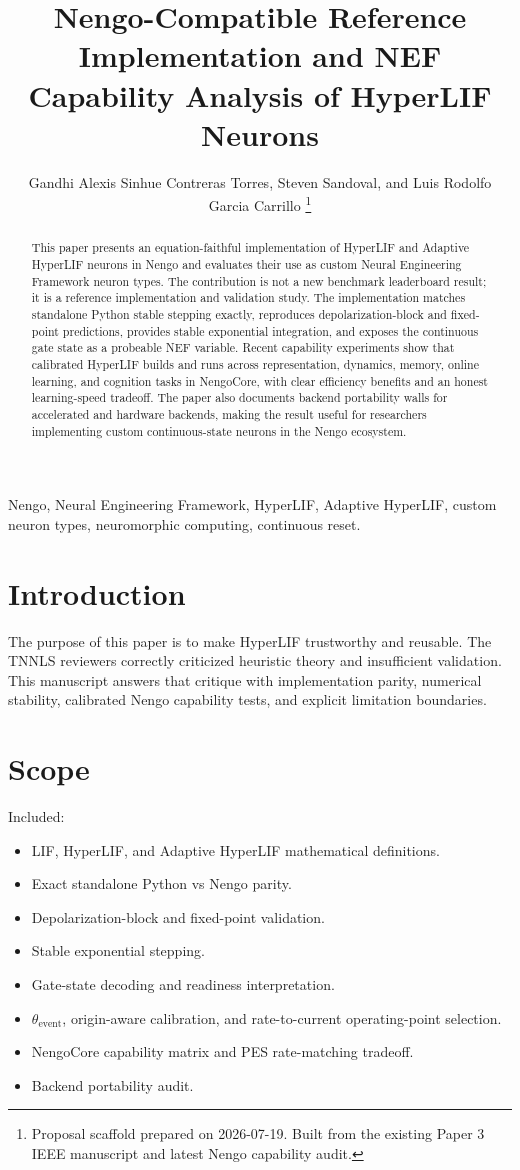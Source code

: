 \documentclass[journal]{IEEEtran}
\title{Nengo-Compatible Reference Implementation and NEF Capability Analysis of HyperLIF Neurons}
\author{Gandhi Alexis Sinhue Contreras Torres, Steven Sandoval, and Luis Rodolfo Garcia Carrillo%
\thanks{Proposal scaffold prepared on 2026-07-19. Built from the existing Paper 3 IEEE manuscript and latest Nengo capability audit.}}
\begin{document}
\maketitle

\begin{abstract}
This paper presents an equation-faithful implementation of HyperLIF and Adaptive HyperLIF neurons in Nengo and evaluates their use as custom Neural Engineering Framework neuron types. The contribution is not a new benchmark leaderboard result; it is a reference implementation and validation study. The implementation matches standalone Python stable stepping exactly, reproduces depolarization-block and fixed-point predictions, provides stable exponential integration, and exposes the continuous gate state as a probeable NEF variable. Recent capability experiments show that calibrated HyperLIF builds and runs across representation, dynamics, memory, online learning, and cognition tasks in NengoCore, with clear efficiency benefits and an honest learning-speed tradeoff. The paper also documents backend portability walls for accelerated and hardware backends, making the result useful for researchers implementing custom continuous-state neurons in the Nengo ecosystem.
\end{abstract}

\begin{IEEEkeywords}
Nengo, Neural Engineering Framework, HyperLIF, Adaptive HyperLIF, custom neuron types, neuromorphic computing, continuous reset.
\end{IEEEkeywords}

\section{Introduction}
The purpose of this paper is to make HyperLIF trustworthy and reusable. The TNNLS reviewers correctly criticized heuristic theory and insufficient validation. This manuscript answers that critique with implementation parity, numerical stability, calibrated Nengo capability tests, and explicit limitation boundaries.

\section{Scope}
Included:
\begin{itemize}
  \item LIF, HyperLIF, and Adaptive HyperLIF mathematical definitions.
  \item Exact standalone Python vs Nengo parity.
  \item Depolarization-block and fixed-point validation.
  \item Stable exponential stepping.
  \item Gate-state decoding and readiness interpretation.
  \item $\theta_{\mathrm{event}}$, origin-aware calibration, and rate-to-current operating-point selection.
  \item NengoCore capability matrix and PES rate-matching tradeoff.
  \item Backend portability audit.
\end{itemize}
\end{document}
